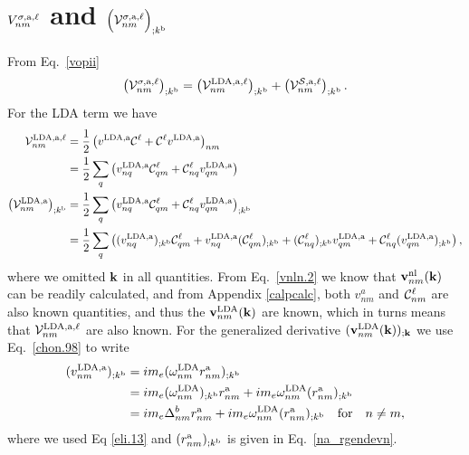 \section{\texorpdfstring{$V^{\sigma,\mathrm{a},\ell}_{nm}$}{Vnm}
and
\texorpdfstring{$\Big({\cal
    V}^{\sigma,\mathrm{a},\ell}_{nm}\Big)_{;k^{\mathrm{b}}}$}{(Vnm);kb}
}\label{calvs} 
From Eq.~\eqref{vopii}
\begin{align}\label{a.1}
\left(
{\mathbf{\cal V}}^{\sigma,\mathrm{a},\ell}_{nm}
\right)_{;k^{\mathrm{b}}}
=
\left(
{\mathbf{\cal V}}^{\mathrm{LDA},\mathrm{a},\ell}_{nm}
\right)_{;k^{\mathrm{b}}}
+
\left(
{\mathbf{\cal V}}^{{\cal S},\mathrm{a},\ell}_{nm}
\right)_{;k^{\mathrm{b}}}
.
\end{align} 
For the LDA term we have
\begin{align}\label{a.2}
{\mathbf{\cal V}}^{\mathrm{LDA},\mathrm{a},\ell}_{nm}
&=
\frac{1}{2}\left(  
v^{\mathrm{LDA},\mathrm{a}}{\mathbf{\cal C}}^\ell+{\mathbf{\cal C}}^\ell v^{\mathrm{LDA},\mathrm{a}}
\right)_{nm}
\nonumber\\
&=
\frac{1}{2}\sum_q\left(  
v^{\mathrm{LDA},\mathrm{a}}_{nq}{\mathbf{\cal C}}^\ell_{qm}+{\mathbf{\cal C}}^\ell_{nq} v^{\mathrm{LDA},\mathrm{a}}_{qm}
\right)
\nonumber\\
\left({\mathbf{\cal V}}^{\mathrm{LDA},\mathrm{a}}_{nm}\right)_{;k^{\mathrm{b}}}
&=
\frac{1}{2}\sum_q\left(  
v^{\mathrm{LDA},\mathrm{a}}_{nq}{\mathbf{\cal C}}^\ell_{qm}+{\mathbf{\cal C}}^\ell_{nq} v^{\mathrm{LDA},\mathrm{a}}_{qm}
\right) _{;k^{\mathrm{b}}}
\nonumber\\
&=
\frac{1}{2}\sum_q\left(
(v^{\mathrm{LDA},\mathrm{a}}_{nq})_{;k^{\mathrm{b}}}{\mathbf{\cal C}}^\ell_{qm}
+   
v^{\mathrm{LDA},\mathrm{a}}_{nq}({\mathbf{\cal C}}^\ell_{qm})_{;k^{\mathrm{b}}}
+
({\mathbf{\cal C}}^\ell_{nq})_{;k^{\mathrm{b}}} v^{\mathrm{LDA},\mathrm{a}}_{qm}
+
{\mathbf{\cal C}}^\ell_{nq} (v^{\mathrm{LDA},\mathrm{a}}_{qm})_{;k^{\mathrm{b}}}
\right)
,
\end{align}   
where we omitted $\mathbf{k}$ in all quantities.
From Eq.~\eqref{vnln.2} we know that $\mathbf{v}^{\mathrm{nl}}_{nm}(\mathbf{k})$
 can be readily
calculated,
and from Appendix \ref{calpcalc}, both $v^a_{nm}$ and
${\mathbf{\cal C}}_{nm}^\ell$ are also known quantities, 
 and thus the
$\mathbf{v}^{\mathrm{LDA}}_{nm}(\mathbf{k})$ are known, which in turns means that 
${\mathbf{\cal V}}^{\mathrm{LDA},\mathrm{a},\ell}_{nm}$ are also known.
For the generalized derivative 
$(\mathbf{v}^{\mathrm{LDA}}_{nm}(\mathbf{k}))_{;\mathbf{k}}$ we use Eq.~\eqref{chon.98}
to write
\begin{align}\label{a.3}
(v^{\mathrm{LDA},\mathrm{a}}_{nm})_{;k^{\mathrm{b}}}
&=  
im_e(\omega^{\mathrm{LDA}}_{nm}r^{\mathrm{a}}_{nm})_{;k^{\mathrm{b}}}
\nonumber\\
&=  
im_e(\omega^{\mathrm{LDA}}_{nm})_{;k^{\mathrm{b}}} r^{\mathrm{a}}_{nm}
+  
im_e\omega^{\mathrm{LDA}}_{nm}(r^{\mathrm{a}}_{nm})_{;k^{\mathrm{b}}}
\nonumber\\
&=  
im_e\Delta^b_{nm}r^{\mathrm{a}}_{nm}
+ 
im_e\omega^{\mathrm{LDA}}_{nm}(r^{\mathrm{a}}_{nm})_{;k^{\mathrm{b}}}
\quad\mathrm{for}\quad n\ne m
,
\end{align} 
where we used Eq \eqref{eli.13} and $(r^{\mathrm{a}}_{nm})_{;k^{\mathrm{b}}}$ is given
in Eq.~\eqref{na_rgendevn}.

